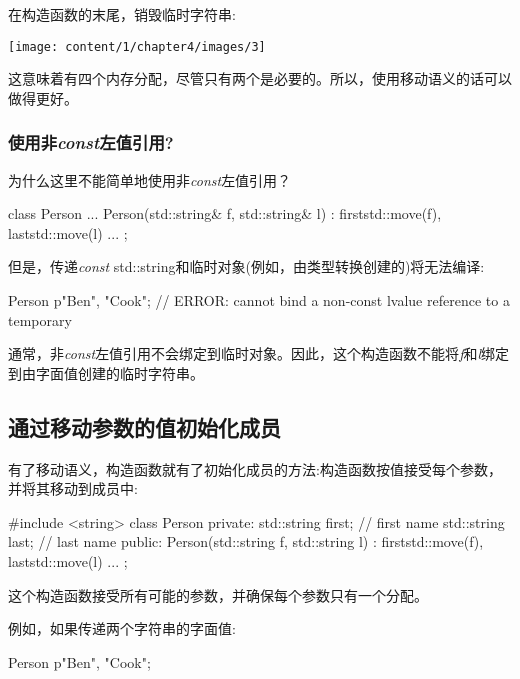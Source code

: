 在构造函数的末尾，销毁临时字符串:

\begin{center}
	\texttt{[image: content/1/chapter4/images/3]}
\end{center}

这意味着有四个内存分配，尽管只有两个是必要的。所以，使用移动语义的话可以做得更好。

\subsubsection{使用非\textit{const}左值引用?}

为什么这里不能简单地使用非\textit{const}左值引用？

\begin{cppcode}
class Person {
	...
	Person(std::string& f, std::string& l)
	: first{std::move(f)}, last{std::move(l)} {
	}
	...
};
\end{cppcode}

但是，传递\textit{const} std::string和临时对象(例如，由类型转换创建的)将无法编译:

\begin{cppcode}
Person p{"Ben", "Cook"}; // ERROR: cannot bind a non-const lvalue reference to a temporary
\end{cppcode}

通常，非\textit{const}左值引用不会绑定到临时对象。因此，这个构造函数不能将\textit{f}和\textit{l}绑定到由字面值创建的临时字符串。

\subsection{通过移动参数的值初始化成员}

有了移动语义，构造函数就有了初始化成员的方法:构造函数按值接受每个参数，并将其移动到成员中:

\begin{cppcode}
#include <string>
class Person {
private:
	std::string first; // first name
	std::string last; // last name
public:
	Person(std::string f, std::string l)
	: first{std::move(f)}, last{std::move(l)} {
	}
	...
};
\end{cppcode}

这个构造函数接受所有可能的参数，并确保每个参数只有一个分配。

例如，如果传递两个字符串的字面值:

\begin{cppcode}
Person p{"Ben", "Cook"};
\end{cppcode}

